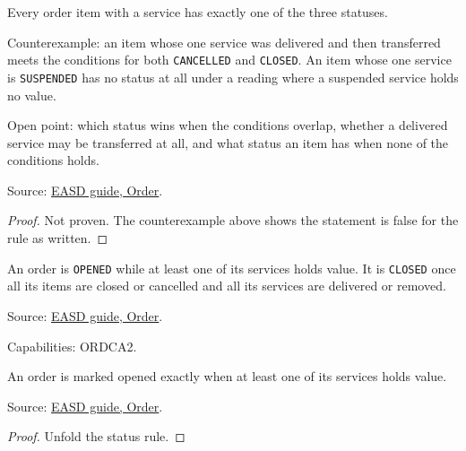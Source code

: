 \begin{theorem}
  \label{thm:one-item-one-status}
  Every order item with a service has exactly one of the three statuses.

  Counterexample: an item whose one service was delivered and then
  transferred meets the conditions for both \texttt{CANCELLED} and
  \texttt{CLOSED}.  An item whose one service is \texttt{SUSPENDED} has no
  status at all under a reading where a suspended service holds no value.

  Open point: which status wins when the conditions overlap, whether a
  delivered service may be transferred at all, and what status an item has
  when none of the conditions holds.

  Source: \href{https://standards.atlassian.net/wiki/spaces/EASD/pages/574849062/Order}{EASD guide, Order}.
\end{theorem}
\begin{proof}
  Not proven.  The counterexample above shows the statement is false for the
  rule as written.
\end{proof}

\begin{definition}
  \label{def:c07-order-status}
  An order is \texttt{OPENED} while at least one of its services holds value.
  It is \texttt{CLOSED} once all its items are closed or cancelled and all its
  services are delivered or removed.

  Source: \href{https://standards.atlassian.net/wiki/spaces/EASD/pages/574849062/Order}{EASD guide, Order}.

  Capabilities: ORDCA2.
\end{definition}

\begin{theorem}
  \label{thm:one-order-opened}
  An order is marked opened exactly when at least one of its services holds
  value.

  Source: \href{https://standards.atlassian.net/wiki/spaces/EASD/pages/574849062/Order}{EASD guide, Order}.
\end{theorem}
\begin{proof}
  Unfold the status rule.
\end{proof}

